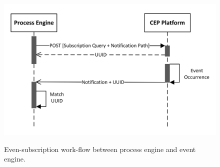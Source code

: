 \begin{figure}[]
	\myfloatalign
	{\includegraphics[width=0.6\linewidth]{chapters/background/subscription-workflow.png}}
	\caption{Even-subscription work-flow between process engine and event engine.}
	\label{fig:bg:subscription-workflow}
\end{figure}






